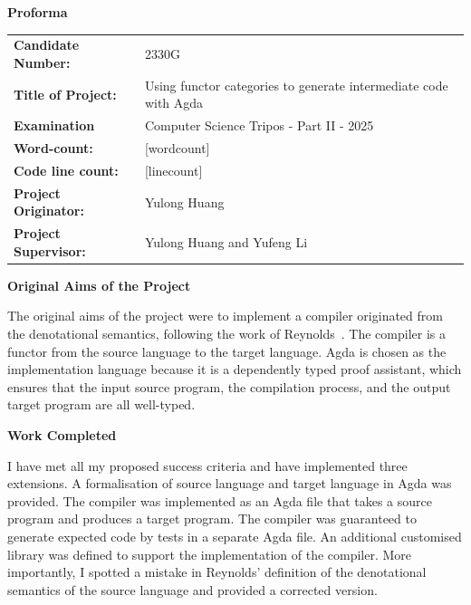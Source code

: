 \documentclass[12pt,a4paper]{report}
\theoremstyle{definition}
\begin{document}
\begin{titlepage}
    \vspace*{5em}
    \textbf{\LARGE Proforma}
    \vspace{2em}

    \begin{tabular}{ll}
        \textbf{Candidate Number:} & 2330G \\
        \textbf{Title of Project:} & Using functor categories to generate intermediate code with Agda \\
        \textbf{Examination} & Computer Science Tripos - Part II - 2025 \\
        \textbf{Word-count:} & [wordcount] \footnotemark \\
        \textbf{Code line count:} & [linecount] \footnotemark \\
        \textbf{Project Originator:} & Yulong Huang \\
        \textbf{Project Supervisor:} & Yulong Huang and Yufeng Li \\
    \end{tabular}

    \vspace{2em}
    \textbf{\Large Original Aims of the Project}
    \vspace{1em}

    The original aims of the project were to implement a compiler originated from the denotational semantics, following the work of Reynolds~\autocite{Reynolds}. The compiler is a functor from the source language to the target language. Agda is chosen as the implementation language because it is a dependently typed proof assistant, which ensures that the input source program, the compilation process, and the output target program are all well-typed.

    \vspace{2em}
    \textbf{\Large Work Completed}
    \vspace{1em}

    I have met all my proposed success criteria and have implemented three extensions. A formalisation of source language and target language in Agda was provided. The compiler was implemented as an Agda file that takes a source program and produces a target program. The compiler was guaranteed to generate expected code by tests in a separate Agda file. An additional customised library was defined to support the implementation of the compiler. More importantly, I spotted a mistake in Reynolds' definition of the denotational semantics of the source language and provided a corrected version. 


\end{titlepage}
\end{document}
